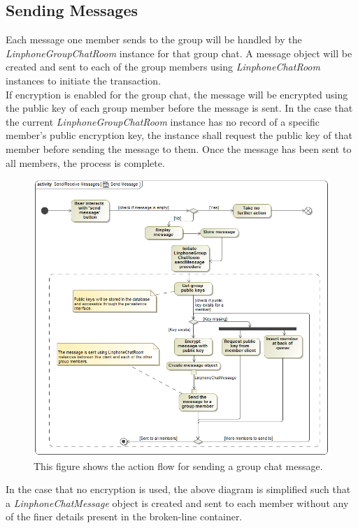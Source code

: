\documentclass[11pt]{article}
\begin{document}
\subsection{Sending Messages}
Each message one member sends to the group will be handled by the \textit{LinphoneGroupChatRoom} instance for that group chat. A message object will be created and sent to each of the group members using \textit{LinphoneChatRoom} instances to initiate the transaction.\\
If encryption is enabled for the group chat, the message will be encrypted using the public key of each group member before the message is sent. In the case that the current \textit{LinphoneGroupChatRoom} instance has no record of a specific member's public encryption key, the instance shall request the public key of that member before sending the message to them. Once the message has been sent to all members, the process is complete.
\begin{figure}[H]
\centering
\includegraphics[width=5in]{./images/activity_send_message.png}
\caption[Send Message Activity Diagram]{This figure shows the action flow for sending a group chat message.}
\label{ad-send-message}
\end{figure}
In the case that no encryption is used, the above diagram is simplified such that a \textit{LinphoneChatMessage} object is created and sent to each member without any of the finer details present in the broken-line container.\\
\end{document}
